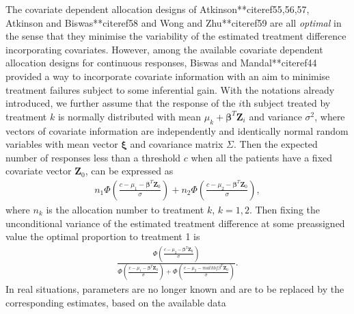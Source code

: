 The covariate dependent allocation designs of
Atkinson**citeref{55,56,57}, Atkinson and Biswas**citeref{58} and Wong and Zhu**citeref{59} are all
\textit{optimal} in the sense that they minimise the variability of
the estimated treatment difference incorporating covariates. However,
among the available covariate dependent allocation designs for
continuous responses,  Biswas and Mandal**citeref{44}
provided a way to incorporate covariate
information with an aim to minimise treatment failures subject to some inferential gain. With the notations already introduced, we further assume that the response of the $i$th subject treated by treatment $k$ is normally distributed with
mean $\mu_{k}+\mathbf{\beta}^{T}{\mathbf{Z}}_{i}$ and variance $\sigma^2$, where vectors of covariate information are independently and identically normal random variables with mean vector $\mathbf{\xi}$ and covariance matrix $\Sigma$. Then the expected number of responses less than a threshold $c$ when all the patients have a fixed covariate vector
${\mathbf{Z}}_{0}$, can be expressed as
\begin{eqnarray*}
n_{1}\Phi\left(\frac{c-\mu_{1}-\mathbf{\beta}^{T}{\mathbf{Z}}_{0}}{\sigma}\right)+n_{2}\Phi\left(\frac{c-\mu_{2}-\mathbf{\beta}^{T}{\mathbf{Z}}_{0}}{\sigma}\right),
\end{eqnarray*}
where $n_{k}$ is the allocation number to treatment $k$, $k=1,2$. Then
fixing the unconditional variance of the estimated treatment
difference at some preassigned value the optimal
proportion to treatment 1 is
\begin{eqnarray*}
\frac{{\Phi\left(\frac{c-\mu_{2}-\mathbf{\beta}^{T}{\mathbf{Z}}_{0}}{\sigma}\right)}}{{\Phi\left(\frac{c-\mu_{1}-\mathbf{\beta}^{T}{\mathbf{Z}}_{0}}{\sigma}\right)}+
{\Phi\left(\frac{c-\mu_{2}-mathbf{\beta}^{T}{\mathbf{Z}}_{0}}{\sigma}\right)}}.
\end{eqnarray*}
In real situations, parameters are no longer known and are to be replaced
by the corresponding estimates, based on the available data

